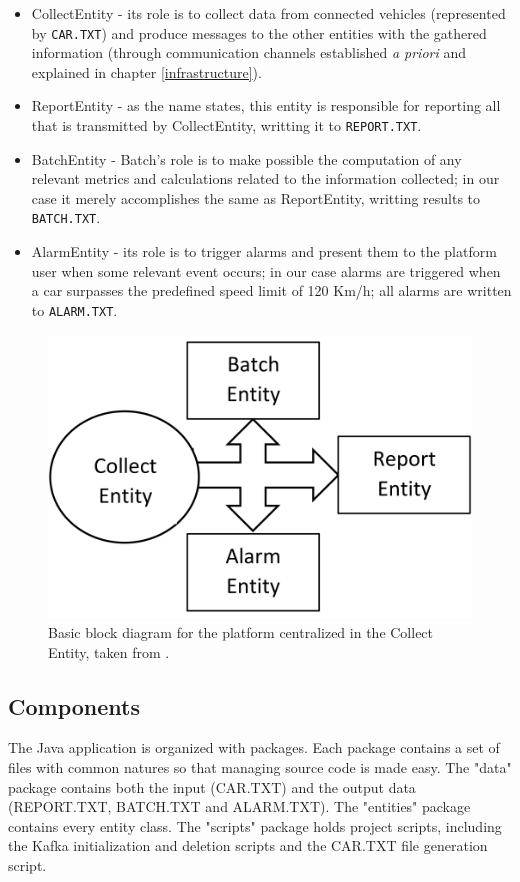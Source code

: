 \documentclass[12pt]{article}
\begin{document}
\vspace{-10pt}
\begin{itemize}[noitemsep]
  \item CollectEntity - its role is to collect data from connected vehicles (represented by \texttt{CAR.TXT}) and produce messages to the other entities with the gathered information (through communication channels established \textit{a priori} and explained in chapter \ref{infrastructure}).
  \item ReportEntity - as the name states, this entity is responsible for reporting all that is transmitted by CollectEntity, writting it to \texttt{REPORT.TXT}.
  \item BatchEntity - Batch's role is to make possible the computation of any relevant metrics and calculations related to the information collected; in our case it merely accomplishes the same as ReportEntity, writting results to \texttt{BATCH.TXT}.
  \item AlarmEntity - its role is to trigger alarms and present them to the platform user when some relevant event occurs; in our case alarms are triggered when a car surpasses the predefined speed limit of 120 Km/h; all alarms are written to \texttt{ALARM.TXT}.
\end{itemize}
\vspace{-10pt}

\begin{figure}[H]
  \centering
  \begin{minipage}{\textwidth}
    \centering
    \includegraphics[width=.4\linewidth]{img/BlockDiagram.png}
  \end{minipage}%
  \caption{Basic block diagram for the platform centralized in the Collect Entity, taken from \cite{assign}.}
  \label{BlockDiagram}
\end{figure} 

\subsection{Components} \label{components} %

The Java application is organized with packages.
Each package contains a set of files with common natures so that managing source code is made easy.
The "data" package contains both the input (CAR.TXT) and the output data (REPORT.TXT, BATCH.TXT and ALARM.TXT).
The "entities" package contains every entity class.
The "scripts" package holds project scripts, including the Kafka initialization and deletion scripts and the CAR.TXT file generation script.
\end{document}
